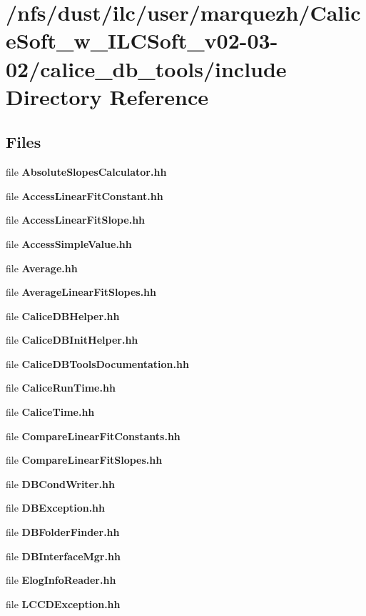 \section{/nfs/dust/ilc/user/marquezh/\-Calice\-Soft\-\_\-w\-\_\-\-I\-L\-C\-Soft\-\_\-v02-\/03-\/02/calice\-\_\-db\-\_\-tools/include Directory Reference}
\label{dir_3d2321603252f692716736b834e5f669}
\subsection*{Files}
\begin{DoxyCompactItemize}
\item 
file {\bf Absolute\-Slopes\-Calculator.\-hh}
\item 
file {\bfseries Access\-Linear\-Fit\-Constant.\-hh}
\item 
file {\bfseries Access\-Linear\-Fit\-Slope.\-hh}
\item 
file {\bfseries Access\-Simple\-Value.\-hh}
\item 
file {\bfseries Average.\-hh}
\item 
file {\bf Average\-Linear\-Fit\-Slopes.\-hh}
\item 
file {\bfseries Calice\-D\-B\-Helper.\-hh}
\item 
file {\bfseries Calice\-D\-B\-Init\-Helper.\-hh}
\item 
file {\bfseries Calice\-D\-B\-Tools\-Documentation.\-hh}
\item 
file {\bfseries Calice\-Run\-Time.\-hh}
\item 
file {\bfseries Calice\-Time.\-hh}
\item 
file {\bf Compare\-Linear\-Fit\-Constants.\-hh}
\item 
file {\bf Compare\-Linear\-Fit\-Slopes.\-hh}
\item 
file {\bfseries D\-B\-Cond\-Writer.\-hh}
\item 
file {\bfseries D\-B\-Exception.\-hh}
\item 
file {\bfseries D\-B\-Folder\-Finder.\-hh}
\item 
file {\bfseries D\-B\-Interface\-Mgr.\-hh}
\item 
file {\bfseries Elog\-Info\-Reader.\-hh}
\item 
file {\bfseries L\-C\-C\-D\-Exception.\-hh}

\end{DoxyCompactItemize}
